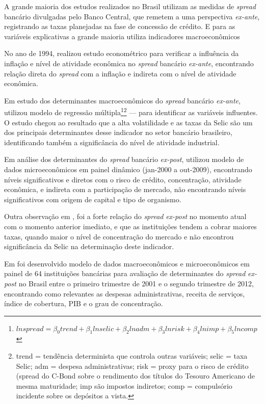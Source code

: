 \documentclass[
  12pt,
  12pt,
  openright,
  oneside,
  a4paper,
  chapter=TITLE,
  section=TITLE,
  subsection=TITLE,
  subsubsection=TITLE,
  english,
  portugues,
  sumario=tradicional]{abntex2}
\begin{document}
A grande maioria dos estudos realizados no Brasil utilizam as medidas de
\emph{spread} bancário divulgadas pelo Banco Central, que remetem a uma perspectiva
\emph{ex-ante}, registrando as taxas planejadas na fase de concessão de crédito. E
para as variáveis explicativas a grande maioria utiliza indicadores
macroeconômicos \cite{dantas:2012}

No ano de 1994, \textcite{aronovich:1994} realizou estudo econométrico para
verificar a influência da inflação e nível de atividade econômica no \emph{spread}
bancário \emph{ex-ante}, encontrando relação direta do \emph{spread} com a inflação e
indireta com o nível de atividade econômica.

Em estudo dos determinantes macroeconômicos do \emph{spread} bancário \emph{ex-ante}, \textcite{oreiro-2006} utilizou modelo de regressão múltipla\footnote{$ln spread = \beta_0 trend + \beta_1 ln selic + \beta_2 ln adm + \beta_3 ln risk + \beta_4 ln imp + \beta_5 ln comp$}\footnote{trend = tendência determinista que controla outras variáveis; selic = taxa Selic; adm = despesa administrativas; risk =  proxy para o risco de crédito (spread do C-Bond sobre o rendimento dos títulos do Tesouro Americano de mesma maturidade; imp são impostos indiretos; comp = compulsório incidente sobre os depósitos a vista.} --- para identificar as variáveis influentes. O estudo chegou ao resultado que a alta volatilidade e as taxas da Selic são um dos principais determinantes desse indicador no setor bancário brasileiro, identificando também a significância do nível de atividade industrial.

Em análise dos determinantes do \emph{spread} bancário \emph{ex-post}, \textcite{dantas:2012} utilizou modelo de dados microeconômicos em painel dinâmico (jan-2000 a out-2009), encontrando níveis significativos e diretos com o risco de crédito, concentração, atividade econômica, e indireta com a participação de mercado, não encontrando níveis significativos com origem de capital e tipo de organismo.

Outra observação em \textcite{dantas:2012}, foi a forte relação do \emph{spread} \emph{ex-post} no momento atual com o momento anterior imediato, e que as instituições tendem a cobrar maiores taxas, quando maior o nível de concentração do mercado e não encontrou significância da Selic na determinação deste indicador.

Em \textcite{almeida:2013} foi desenvolvido modelo de dados macroeconômicos e microeconômicos em painel de 64 instituições bancárias para avaliação de determinantes do \emph{spread} \emph{ex-post} no Brasil entre o primeiro trimestre de 2001 e o segundo trimestre de 2012, encontrando como relevantes as despesas administrativas, receita de serviços, índice de cobertura, PIB e o grau de concentração.
\end{document}
